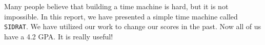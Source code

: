 Many people \cite{Smith_2012} believe that building a time machine is hard, but it is not impossible. In this report, we have presented a simple time machine called \texttt{SIDRAT}. We have utilized our work to change our scores in the past. Now all of us have a 4.2 GPA. It is really useful!
